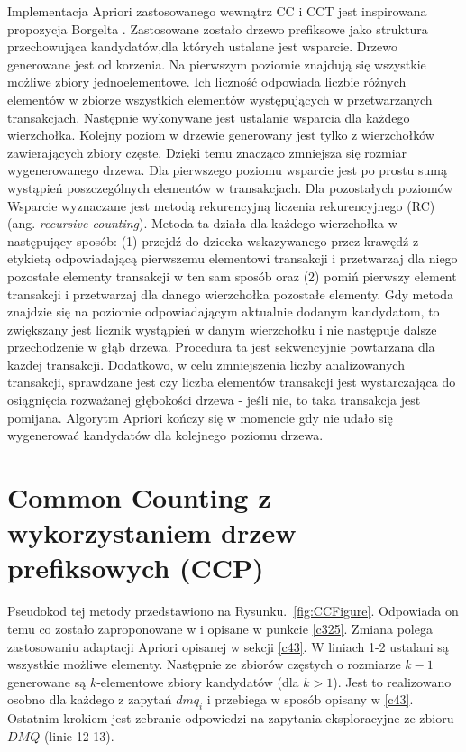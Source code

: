 Implementacja Apriori zastosowanego wewnątrz CC i CCT jest inspirowana propozycja Borgelta \cite{Borgelt}. Zastosowane zostało drzewo prefiksowe jako struktura przechowująca kandydatów,dla których ustalane jest wsparcie. Drzewo generowane jest od korzenia. Na pierwszym poziomie znajdują się wszystkie możliwe zbiory jednoelementowe. Ich liczność odpowiada liczbie różnych elementów w zbiorze wszystkich elementów występujących w przetwarzanych transakcjach. Następnie wykonywane jest ustalanie wsparcia dla każdego wierzchołka. Kolejny poziom w drzewie generowany jest tylko z wierzchołków zawierających zbiory częste. Dzięki temu znacząco zmniejsza się rozmiar wygenerowanego drzewa. Dla pierwszego poziomu wsparcie jest po prostu sumą wystąpień poszczególnych elementów w transakcjach. Dla pozostałych poziomów Wsparcie wyznaczane jest metodą rekurencyjną liczenia rekurencyjnego (RC) (ang. \textit{recursive counting}). Metoda ta działa dla każdego wierzchołka w następujący sposób: (1) przejdź do dziecka wskazywanego przez krawędź z etykietą odpowiadającą pierwszemu elementowi transakcji i przetwarzaj dla niego pozostałe elementy transakcji w ten sam sposób oraz (2) pomiń pierwszy element transakcji i przetwarzaj dla danego wierzchołka pozostałe elementy. Gdy metoda znajdzie się na poziomie odpowiadającym aktualnie dodanym kandydatom, to zwiększany jest licznik wystąpień w danym wierzchołku i nie następuje dalsze przechodzenie w głąb drzewa. Procedura ta jest sekwencyjnie powtarzana dla każdej transakcji. Dodatkowo, w celu zmniejszenia liczby analizowanych transakcji, sprawdzane jest czy liczba elementów transakcji jest wystarczająca do osiągnięcia rozważanej głębokości drzewa - jeśli nie, to taka transakcja jest pomijana. Algorytm Apriori kończy się w momencie gdy nie udało się wygenerować kandydatów dla kolejnego poziomu drzewa.

\section{Common Counting z wykorzystaniem drzew prefiksowych (CCP)}
\label{c44}
Pseudokod tej metody przedstawiono na Rysunku.~\ref{fig:CCFigure}. Odpowiada on temu co zostało zaproponowane w \cite{WojciechowskiCC} i opisane w punkcie \ref{c325}. Zmiana polega zastosowaniu adaptacji Apriori opisanej w sekcji \ref{c43}. W liniach 1-2 ustalani są wszystkie możliwe elementy. Następnie ze zbiorów częstych o rozmiarze \(k-1\) generowane są \(k\)-elementowe zbiory kandydatów (dla \(k > 1\)). Jest to realizowano osobno dla każdego z zapytań \(dmq_i\) i przebiega w sposób opisany w \ref{c43}. Ostatnim krokiem jest zebranie odpowiedzi na zapytania eksploracyjne ze zbioru \(DMQ\) (linie 12-13).


